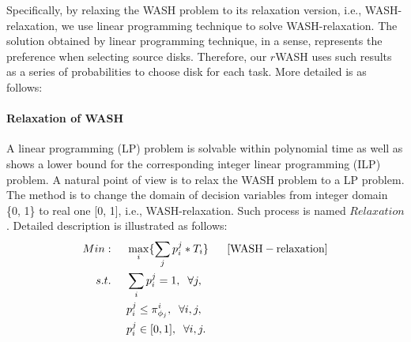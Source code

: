 \documentclass[conference]{IEEEtran}
\begin{document}

Specifically, by relaxing the WASH problem to its relaxation version, i.e., WASH-relaxation, we use linear programming technique to solve WASH-relaxation. The solution obtained by linear programming technique, in a sense, represents the preference when selecting source disks. Therefore, our $r$WASH  uses such results as a series of probabilities to choose disk for each task. More detailed is as follows:  %



\paragraph{\textbf{Relaxation of WASH}} A linear programming (LP) problem is solvable within polynomial time as well as shows a lower bound for the corresponding integer linear programming (ILP) problem. A natural point of view is to relax the WASH problem to a LP problem. The method is to change the domain of decision variables from integer domain \{0, 1\} to real one [0, 1], i.e., WASH-relaxation. Such process is named $Relaxation$. Detailed description is illustrated as follows: 
\vspace{-0.2cm}
 \begin{align}
 Min:&\;\;\;\;\;\max\limits_{i}\{\sum_{j}p_i^j*T_i\}\;\;\;\;\;\;[\rm{WASH-relaxation}]\nonumber\\
 s.t. 
 &\;\;\;\;\;\sum_{i}p_i^j = 1,\;\;\forall j,\nonumber\\
 &\;\;\;\;\;p_i^j \leq \pi_{\phi_j}^{i},\;\;\forall i,j,\nonumber\\
 &\;\;\;\;\;p_i^j \in[0, 1],\;\;\forall i,j.\nonumber
 \end{align}
\end{document}
